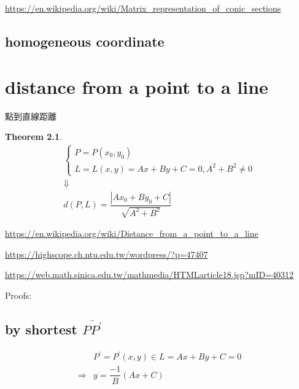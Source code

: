 \documentclass[
]{book}
\newtheorem{theorem}{Theorem}[chapter]
\theoremstyle{definition}
\theoremstyle{definition}
\theoremstyle{definition}
\theoremstyle{definition}
\theoremstyle{remark}
\begin{document}
\url{https://en.wikipedia.org/wiki/Matrix_representation_of_conic_sections}

\hypertarget{homogeneous-coordinate}{%
\section{homogeneous coordinate}\label{homogeneous-coordinate}}

\hypertarget{distance-from-a-point-to-a-line}{%
\chapter{distance from a point to a line}\label{distance-from-a-point-to-a-line}}

\begin{CJK}{UTF8}{bsmi}
點到直線距離
\end{CJK}

\begin{theorem}
\protect\hypertarget{thm:unnamed-chunk-1}{}\label{thm:unnamed-chunk-1}\[
\begin{array}{c}
\begin{cases}
P=P\left(x_{0},y_{0}\right)\\
L=L\left(x,y\right)=Ax+By+C=0,A^{2}+B^{2}\ne0
\end{cases}\\
\Downarrow\\
d\left(P,L\right)=\dfrac{\left|Ax_{0}+By_{0}+C\right|}{\sqrt{A^{2}+B^{2}}}
\end{array}
\]
\end{theorem}

\url{https://en.wikipedia.org/wiki/Distance_from_a_point_to_a_line}

\url{https://highscope.ch.ntu.edu.tw/wordpress/?p=47407}

\url{https://web.math.sinica.edu.tw/mathmedia/HTMLarticle18.jsp?mID=40312}

Proofs:

\hypertarget{by-shortest-overlineppprime}{%
\section{\texorpdfstring{by shortest \(\overline{PP^{\prime}}\)}{by shortest \textbackslash overline\{PP\^{}\{\textbackslash prime\}\}}}\label{by-shortest-overlineppprime}}

\[
\begin{aligned}
 & P^{\prime}=P^{\prime}\left(x,y\right)\in L=Ax+By+C=0\\
\Rightarrow & y=\dfrac{-1}{B}\left(Ax+C\right)
\end{aligned}
\]
\end{document}

